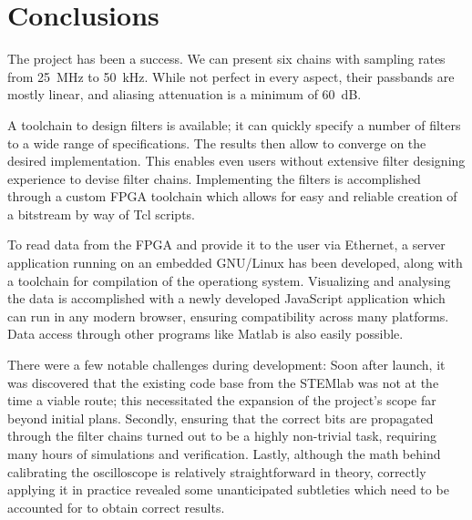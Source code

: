 %
%
\chapter{Conclusions} %
\label{ch:conclusions}
\enlargethispage{6ex}

The project has been a success. We  can present six chains with sampling rates
from  \SI{25}{\mega\Hz}  to  \SI{50}{\kilo\Hz}. While  not  perfect  in  every
aspect,  their passbands  are mostly  linear,  and aliasing  attenuation is  a
minimum of \SI{60}{\dB}.

A toolchain to design filters is available; it can quickly specify a number of
filters to a wide range of specifications.  The results then allow to converge
on  the  desired implementation. This  enables  even  users without  extensive
filter designing experience to devise filter chains.  Implementing the filters
is accomplished  through a  custom FPGA  toolchain which  allows for  easy and
reliable creation of a bitstream by way of Tcl scripts.

To read data from  the FPGA and provide it to the user  via Ethernet, a server
application running on an embedded GNU/Linux  has been developed, along with a
toolchain for compilation of the operationg system.  Visualizing and analysing
the  data  is  accomplished  with a  newly  developed  JavaScript  application
which  can run  in  any  modern browser,  ensuring  compatibility across  many
platforms. Data  access through  other  programs like  Matlab  is also  easily
possible.

There were a few notable  challenges during development: Soon after launch, it
was discovered  that the existing  code base from the  STEMlab was not  at the
time a  viable route; this necessitated  the expansion of the  project's scope
far  beyond  initial  plans. Secondly,  ensuring that  the  correct  bits  are
propagated through  the filter chains  turned out  to be a  highly non-trivial
task, requiring  many hours of simulations  and verification. Lastly, although
the  math behind  calibrating the  oscilloscope is  relatively straightforward
in  theory, correctly  applying  it in  practice  revealed some  unanticipated
subtleties which need to be accounted for to obtain correct results.

